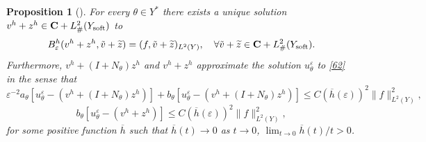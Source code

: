 \documentclass[11pt]{article}
\newcommand\e {\varepsilon}
\newcommand\soft{{\rm soft}}
\def\C{\mathbf {C}}
\newtheorem{proposition}[theorem]{Proposition}
\theoremstyle{remark}
\begin{document}
\begin{proposition}[{\cite[Theorem 5.6]{CKS2023}}]  \label{th7.5}
	For every $\theta\in Y^*$ there exists a unique solution $v^h + z^h \in   \C+ L^2_\#(Y_\soft)$ to
\begin{equation}\label{120}
	B^h_\e(v^h + z^h, \tilde v+ \widetilde z) =( f, \tilde v+\widetilde z )_{L^2(Y)}, \quad \forall \tilde v+\widetilde z \in \C+ L^2_\#(Y_\soft).
\end{equation}
	Furthermore, $v^h + (I+N_\theta) z^h$ and $v^h + z^h$ approximate the solution $u^\e_\theta$ to \eqref{62} in the sense that
	\begin{equation}\label{126}
		\e^{-2}  a_\theta[u^\e_\theta - (v^h + (I+N_\theta) z^h)] + b_\theta[u^\e_\theta - (v^h + (I+N_\theta) z^h)] \leq C (\overline{h}(\e))^2 \|f\|^2_{L^2(Y)} ,
	\end{equation}
	\begin{equation}\label{205}
		b_\theta[u^\e_\theta - (v^h + z^h)] \leq C  (\overline{h}(\e))^2 \|f\|^2_{L^2(Y)} ,
	\end{equation}
for some positive function $\overline{h}$ such that $\overline{h}(t) \to 0$ as $t\to 0$, $\lim_{t\to 0} \overline{h}(t)/t >0$.
\end{proposition}
\end{document}
